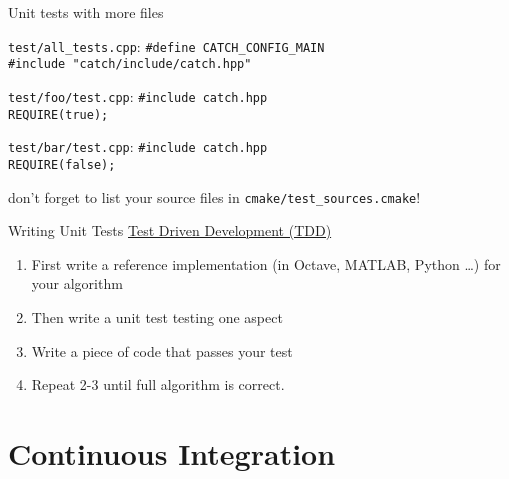 \documentclass[10pt]{beamer}
\begin{document}
\begin{frame}{Unit tests with more files}
    \begin{beamerboxesrounded}{\texttt{test/all\_tests.cpp}:}
        \texttt{\#define CATCH\_CONFIG\_MAIN} \\
        \texttt{\#include "catch/include/catch.hpp"}
    \end{beamerboxesrounded}
    \vspace{0.1cm}
    \begin{beamerboxesrounded}{\texttt{test/foo/test.cpp}:}
        \texttt{\#include catch.hpp} \\
        \texttt{REQUIRE(true);}
    \end{beamerboxesrounded}
    \vspace{0.1cm}
    \begin{beamerboxesrounded}{\texttt{test/bar/test.cpp}:}
        \texttt{\#include catch.hpp} \\
        \texttt{REQUIRE(false);}
    \end{beamerboxesrounded}
    \vspace{0.1cm}
    \centering don't forget to list your source files in \texttt{cmake/test\_sources.cmake}!
\end{frame}

\begin{frame}{Writing Unit Tests}
    \large \underline{Test Driven Development (TDD)}
    \begin{enumerate}
        \item First write a reference implementation (in Octave, MATLAB, Python \ldots) for your algorithm
        \item Then write a unit test testing one aspect
        \item Write a piece of code that passes your test
        \item Repeat 2-3 until full algorithm is correct.
    \end{enumerate}
\end{frame}

\section{Continuous Integration}
\end{document}
